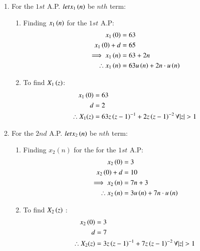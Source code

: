 \documentclass[journal,12pt,twocolumn]{IEEEtran}
\theoremstyle{remark}
\begin{document}
\begin{enumerate}
\item
For the $ 1{st}$ A.P. $ let x_1\left(n\right)$  be $ nth$ term: 
\begin{enumerate}
\item
Finding $ x_1\left(n\right)$ for the $ 1{st}$ A.P:
\begin{align}
x_1\left(0\right) &= 63\\
x_1\left(0\right)+d &= 65\\
\implies x_1\left(n\right) &= 63 + 2n \label{eq:3}\\
\therefore x_1\left(n\right) &= 63u\left(n\right) + 2n\cdot u\left(n\right)
\end{align}
\item
To find $ X_1\left(z\right)$:
\begin{align}
x_1\brak{0}&=63\\
d &= 2\\
\therefore X_1(z) &= 63z\brak{z-1}^{-1} + 2z\brak{z-1}^{-2}  \forall  |z|>1
\end{align}
\end{enumerate}
\item
For the $ 2{nd}$ A.P.  $ let x_2\left(n\right)$  be $ nth$ term:\\
\begin{enumerate}
\item 
Finding $ x_2(n)$ for the for the $ 1{st}$ A.P:
\begin{align}
x_2\left(0\right) &= 3 \\
x_2\left(0\right)+d &= 10\\
\implies x_2\left(n\right) &= 7n + 3 \label{eq:4}\\
\therefore x_2\left(n\right) &= 3u\left(n\right) + 7n\cdot u\left(n\right) \label{eq:4}
\end{align}
\item
To find $ X_2\left(z\right)$ :\\
\begin{align}
x_2\brak{0}&=3\\
d &= 7\\
\therefore X_2(z) &= 3z\brak{z-1}^{-1} + 7z\brak{z-1}^{-2}  \forall  |z|>1
\end{align}


\end{enumerate}
\end{enumerate}
\end{document}
